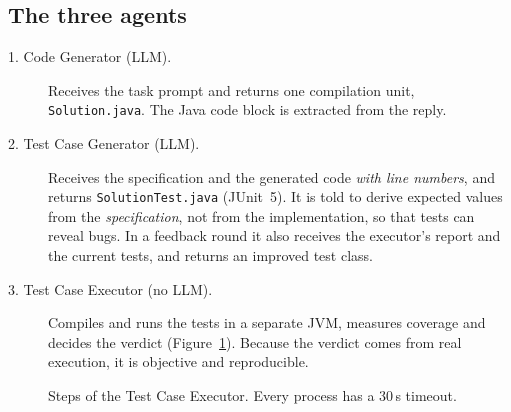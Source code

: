 \documentclass[11pt,a4paper]{article}
\begin{document}
\subsection{The three agents}
\begin{description}
  \item[1. Code Generator (LLM).] Receives the task prompt and returns one compilation unit, \texttt{Solution.java}. The Java code block is extracted from the reply.
  \item[2. Test Case Generator (LLM).] Receives the specification and the generated code \emph{with line numbers}, and returns \texttt{SolutionTest.java} (JUnit~5). It is told to derive expected values from the \emph{specification}, not from the implementation, so that tests can reveal bugs. In a feedback round it also receives the executor's report and the current tests, and returns an improved test class.
  \item[3. Test Case Executor (no LLM).] Compiles and runs the tests in a separate JVM, measures coverage and decides the verdict (Figure~\ref{fig:executor}). Because the verdict comes from real execution, it is objective and reproducible.
\end{description}

\begin{figure}[H]
\centering
{}
\caption{Steps of the Test Case Executor. Every process has a 30\,s timeout.}
\label{fig:executor}
\end{figure}
\end{document}
